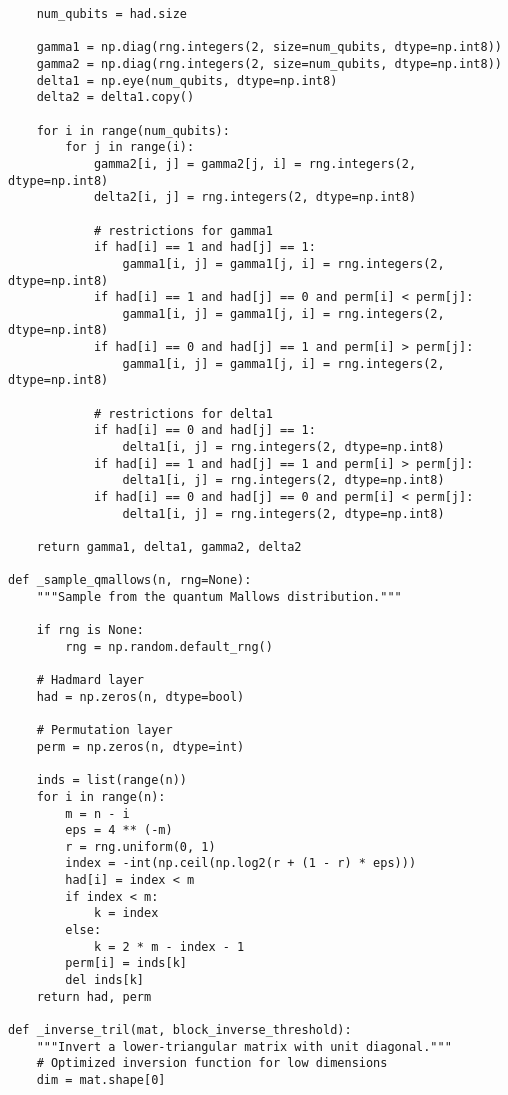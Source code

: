 \documentclass[8pt]{article}
\begin{document}
\begin{appendices}
\begin{verbatim}
    num_qubits = had.size
    
    gamma1 = np.diag(rng.integers(2, size=num_qubits, dtype=np.int8))
    gamma2 = np.diag(rng.integers(2, size=num_qubits, dtype=np.int8))
    delta1 = np.eye(num_qubits, dtype=np.int8)
    delta2 = delta1.copy()
    
    for i in range(num_qubits):
        for j in range(i):
            gamma2[i, j] = gamma2[j, i] = rng.integers(2, dtype=np.int8)
            delta2[i, j] = rng.integers(2, dtype=np.int8)
            
            # restrictions for gamma1
            if had[i] == 1 and had[j] == 1:
                gamma1[i, j] = gamma1[j, i] = rng.integers(2, dtype=np.int8)
            if had[i] == 1 and had[j] == 0 and perm[i] < perm[j]:
                gamma1[i, j] = gamma1[j, i] = rng.integers(2, dtype=np.int8)
            if had[i] == 0 and had[j] == 1 and perm[i] > perm[j]:
                gamma1[i, j] = gamma1[j, i] = rng.integers(2, dtype=np.int8)
            
            # restrictions for delta1
            if had[i] == 0 and had[j] == 1:
                delta1[i, j] = rng.integers(2, dtype=np.int8)
            if had[i] == 1 and had[j] == 1 and perm[i] > perm[j]:
                delta1[i, j] = rng.integers(2, dtype=np.int8)
            if had[i] == 0 and had[j] == 0 and perm[i] < perm[j]:
                delta1[i, j] = rng.integers(2, dtype=np.int8)
    
    return gamma1, delta1, gamma2, delta2

def _sample_qmallows(n, rng=None):
    """Sample from the quantum Mallows distribution."""

    if rng is None:
        rng = np.random.default_rng()

    # Hadmard layer
    had = np.zeros(n, dtype=bool)

    # Permutation layer
    perm = np.zeros(n, dtype=int)

    inds = list(range(n))
    for i in range(n):
        m = n - i
        eps = 4 ** (-m)
        r = rng.uniform(0, 1)
        index = -int(np.ceil(np.log2(r + (1 - r) * eps)))
        had[i] = index < m
        if index < m:
            k = index
        else:
            k = 2 * m - index - 1
        perm[i] = inds[k]
        del inds[k]
    return had, perm

def _inverse_tril(mat, block_inverse_threshold):
    """Invert a lower-triangular matrix with unit diagonal."""
    # Optimized inversion function for low dimensions
    dim = mat.shape[0]


\end{verbatim}
\end{appendices}
\end{document}
